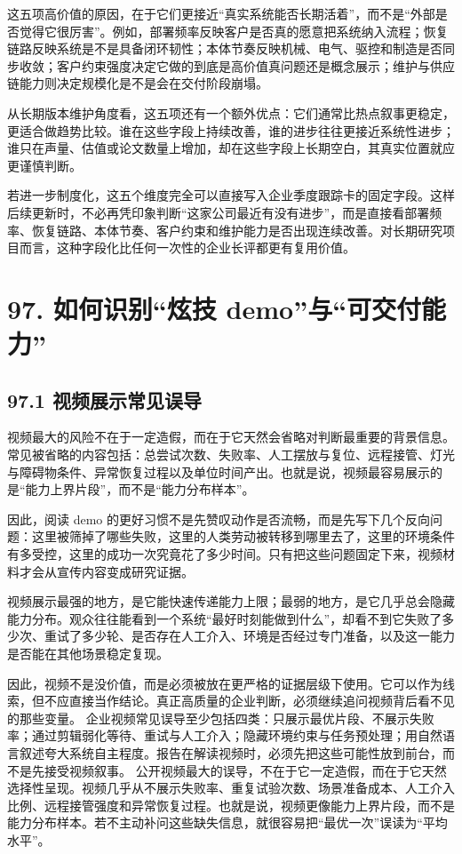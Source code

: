 这五项高价值的原因，在于它们更接近“真实系统能否长期活着”，而不是“外部是否觉得它很厉害”。例如，部署频率反映客户是否真的愿意把系统纳入流程；恢复链路反映系统是不是具备闭环韧性；本体节奏反映机械、电气、驱控和制造是否同步收敛；客户约束强度决定它做的到底是高价值真问题还是概念展示；维护与供应链能力则决定规模化是不是会在交付阶段崩塌。

从长期版本维护角度看，这五项还有一个额外优点：它们通常比热点叙事更稳定，更适合做趋势比较。谁在这些字段上持续改善，谁的进步往往更接近系统性进步；谁只在声量、估值或论文数量上增加，却在这些字段上长期空白，其真实位置就应更谨慎判断。

若进一步制度化，这五个维度完全可以直接写入企业季度跟踪卡的固定字段。这样后续更新时，不必再凭印象判断“这家公司最近有没有进步”，而是直接看部署频率、恢复链路、本体节奏、客户约束和维护能力是否出现连续改善。对长期研究项目而言，这种字段化比任何一次性的企业长评都更有复用价值。

\section*{97. 如何识别“炫技 demo”与“可交付能力”}

\subsection*{97.1 视频展示常见误导}


视频最大的风险不在于一定造假，而在于它天然会省略对判断最重要的背景信息。常见被省略的内容包括：总尝试次数、失败率、人工摆放与复位、远程接管、灯光与障碍物条件、异常恢复过程以及单位时间产出。也就是说，视频最容易展示的是“能力上界片段”，而不是“能力分布样本”。

因此，阅读 demo 的更好习惯不是先赞叹动作是否流畅，而是先写下几个反向问题：这里被筛掉了哪些失败，这里的人类劳动被转移到哪里去了，这里的环境条件有多受控，这里的成功一次究竟花了多少时间。只有把这些问题固定下来，视频材料才会从宣传内容变成研究证据。

视频展示最强的地方，是它能快速传递能力上限；最弱的地方，是它几乎总会隐藏能力分布。观众往往能看到一个系统“最好时刻能做到什么”，却看不到它失败了多少次、重试了多少轮、是否存在人工介入、环境是否经过专门准备，以及这一能力是否能在其他场景稳定复现。

因此，视频不是没价值，而是必须被放在更严格的证据层级下使用。它可以作为线索，但不应直接当作结论。真正高质量的企业判断，必须继续追问视频背后看不见的那些变量。 企业视频常见误导至少包括四类：只展示最优片段、不展示失败率；通过剪辑弱化等待、重试与人工介入；隐藏环境约束与任务预处理；用自然语言叙述夸大系统自主程度。报告在解读视频时，必须先把这些可能性放到前台，而不是先接受视频叙事。 公开视频最大的误导，不在于它一定造假，而在于它天然选择性呈现。视频几乎从不展示失败率、重复试验次数、场景准备成本、人工介入比例、远程接管强度和异常恢复过程。也就是说，视频更像能力上界片段，而不是能力分布样本。若不主动补问这些缺失信息，就很容易把“最优一次”误读为“平均水平”。

